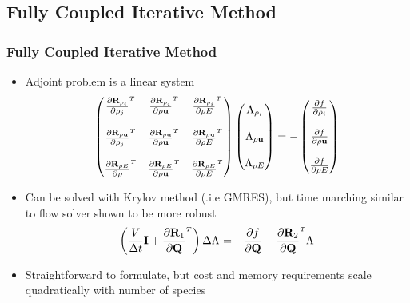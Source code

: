 \documentclass{beamer}
\begin{document}
\subsection{Fully Coupled Iterative Method}

\begin{frame}
  \frametitle{Fully Coupled Iterative Method}
  \begin{itemize}
    \item Adjoint problem is a linear system
      \begin{equation*}
        \begin{pmatrix}
          \rtdiff{\rho_i}{\rho_j} & \rtdiff{\rho_i}{\rho \vu} & 
          \rtdiff{\rho_i}{\rho E} \\ \\
          \rtdiff{\rho \vu}{\rho_j} & \rtdiff{\rho \vu}{\rho \vu} & 
          \rtdiff{\rho \vu}{\rho E} \\ \\
          \rtdiff{\rho E}{\rho} & \rtdiff{\rho E}{\rho \vu} & 
          \rtdiff{\rho E}{\rho E}
        \end{pmatrix}
        \begin{pmatrix}
          \adjlam{\rho_i} \\ \\
          \adjlam{\rho \vu} \\ \\
          \adjlam{\rho E}
        \end{pmatrix}
        = -
        \begin{pmatrix}
          \pd{f}{\rho_i} \\ \\
          \pd{f}{\rho \vu} \\ \\
          \pd{f}{\rho E}
        \end{pmatrix}
      \end{equation*}
    \item Can be solved with Krylov method (.i.e GMRES), but time marching
      similar to flow solver shown to be more robust
      \begin{equation*}
        \left( \frac{V}{\Delta t} \mi + \rtdiff{1}{\mq} \right)
        \Delta \adjlam{}
        = -\pd{f}{\mq}
        - \rtdiff{2}{\mq} \adjlam{}
      \end{equation*}
    \item Straightforward to formulate, but cost and memory requirements
      scale quadratically with number of species
      
  \end{itemize}
\end{frame}
\end{document}
